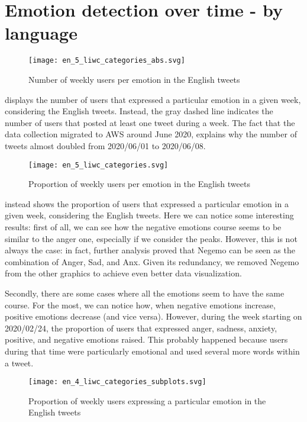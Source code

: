 \section{Emotion detection over time - by language}
\label{sec:emotion-by-language-results}

\begin{figure}[H]
	\centering
    	\texttt{[image: en\_5\_liwc\_categories\_abs.svg]}
    	\caption{Number of weekly users per emotion in the English tweets}
    	\label{fig:en-5-liwc-categories-abs}
\end{figure}

 displays the number of users that expressed a particular emotion in a given week, considering the English tweets. Instead, the gray dashed line indicates the number of users that posted at least one tweet during a week. The fact that the data collection migrated to AWS around June 2020, explains why the number of tweets almost doubled from 2020/06/01 to 2020/06/08.

\begin{figure}[H]
	\centering
    	\texttt{[image: en\_5\_liwc\_categories.svg]}
    	\caption{Proportion of weekly users per emotion in the English tweets}
    	\label{fig:en-5-liwc-categories}
\end{figure}

 instead shows the proportion of users that expressed a particular emotion in a given week, considering the English tweets. Here we can notice some interesting results: first of all, we can see how the negative emotions course seems to be similar to the anger one, especially if we consider the peaks. However, this is not always the case: in fact, further analysis proved that Negemo can be seen as the combination of Anger, Sad, and Anx. Given its redundancy, we removed Negemo from the other graphics to achieve even better data visualization.

Secondly, there are some cases where all the emotions seem to have the same course. For the most, we can notice how, when negative emotions increase, positive emotions decrease (and vice versa). However, during the week starting on 2020/02/24, the proportion of users that expressed anger, sadness, anxiety, positive, and negative emotions raised. This probably happened because users during that time were particularly emotional and used several more words within a tweet.

\begin{figure}[H]
	\centering
    	\texttt{[image: en\_4\_liwc\_categories\_subplots.svg]}
    	\caption{Proportion of weekly users expressing a particular emotion in the English tweets}
    	\label{fig:en-4-liwc-categories-subplots}
\end{figure}

